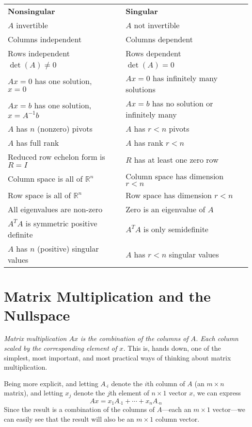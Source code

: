 \documentclass[12pt]{article}
\theoremstyle{plain}
\theoremstyle{definition}
\theoremstyle{remark}
\begin{document}
\begin{table}[h!]
\centering
\begin{tabular}{lll}
\textbf{Nonsingular}                     && \textbf{Singular} \\
$A$ invertible                           && $A$ not invertible \\
Columns independent                      && Columns dependent \\
Rows independent                         && Rows dependent \\
$\det(A)\neq0$                           && $\det(A)=0$ \\
$Ax = 0$ has one solution, $x = 0$       && $Ax=0$ has infinitely many solutions\\
$Ax = b$ has one solution, $x = A^{-1}b$ && $Ax = b$ has no solution or infinitely many \\
$A$ has $n$ (nonzero) pivots             && $A$ has $r<n$ pivots \\
$A$ has full rank                        && $A$ has rank $r<n$ \\
Reduced row echelon form is $R = I$      && $R$ has at least one zero row \\
Column space is all of $\mathbb{R}^n$    && Column space has dimension $r<n$ \\
Row space is all of $\mathbb{R}^n$       && Row space has dimension $r<n$ \\
All eigenvalues are non-zero             && Zero is an eigenvalue of $A$ \\
$A^T A$ is symmetric positive definite   && $A^T A$ is only semidefinite \\
$A$ has $n$ (positive) singular values   && $A$ has $r<n$ singular values
\end{tabular}
\end{table}

\section{Matrix Multiplication and the Nullspace}

{\sl Matrix multiplication $Ax$ is the combination of the columns of $A$. Each column scaled by the corresponding element of $x$.} This is, hands down, one of the simplest, most important, and most practical ways of thinking about matrix multiplication.

Being more explicit, and letting $A_{\cdot i}$ denote the $i$th column of $A$ (an $m\times n$ matrix), and letting $x_j$ denote the $j$th element of $n\times 1$ vector $x$, we can express
\[
  A x = x_1 A_{\cdot 1}  + \cdots + x_n A_{\cdot n}
\]
Since the result is a combination of the columns of $A$---each an $m\times 1$ vector---we can easily see that the result will also be an $m\times 1$ column vector.
\end{document}
